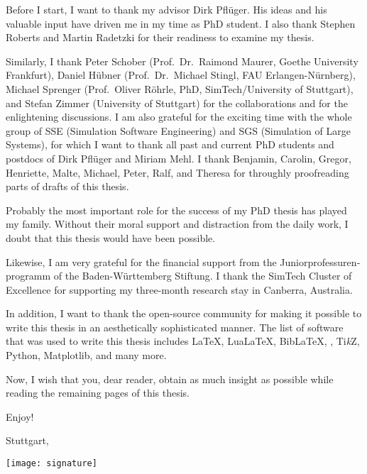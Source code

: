
Before I start, I want to thank my advisor Dirk Pflüger.
His ideas and his valuable input have driven me in
my time as PhD student.
I also thank Stephen Roberts and Martin Radetzki
for their readiness to examine my thesis.

Similarly, I thank
Peter Schober
(Prof.\ Dr.\ Raimond Maurer, Goethe University Frankfurt),
Daniel Hübner
(Prof.\ Dr.\ Michael Stingl, FAU Erlangen-Nürnberg),
Michael Sprenger
(Prof.\ Oliver Röhrle, PhD, SimTech/University of Stuttgart), and
Stefan Zimmer
(University of Stuttgart) for
the collaborations and for the enlightening discussions.
I am also grateful for the exciting time with the whole group of
SSE (Simulation Software Engineering) and
SGS (Simulation of Large Systems),
for which I want to thank all past and current PhD students and postdocs of
Dirk Pflüger and Miriam Mehl.
I thank Benjamin, Carolin, Gregor, Henriette, Malte, Michael, Peter,
Ralf, and Theresa
for throughly proofreading parts of drafts of this thesis.

Probably the most important role for the success of my PhD thesis
has played my family.
Without their moral support and distraction from the daily work,
I doubt that this thesis would have been possible.

Likewise, I am very grateful for the financial support from
the \foreignlanguage{ngerman}{Juniorprofessurenprogramm} of the
\foreignlanguage{ngerman}{Baden-Württemberg Stiftung}.
I thank the SimTech Cluster of Excellence for supporting
my three-month research stay in Canberra, Australia.

In addition, I want to thank the open-source community for making it possible to
write this thesis in an aesthetically sophisticated manner.
The list of software that was used to write this thesis includes
\LaTeX, Lua\LaTeX, Bib\LaTeX,
\scalebox{0.9}{\KOMAScript}, Ti\emph{k}Z, Python, Matplotlib,
and many more.

\label{page:preface}
Now, I wish that you, dear reader, obtain as much insight as possible
while reading the remaining
 pages of this thesis.

Enjoy!

\vspace{1em}

\noindent
Stuttgart, \thedate

\vspace{0.5em}

\noindent
\texttt{[image: signature]}

\cleardoublepage
